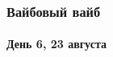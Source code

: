 \begin{frame}
	\frametitle{Вайбовый вайб}
	\framesubtitle{День 6, 23 августа}
    {\tiny
		\begin{minipage}{\fourpicsize}
			\centering
		\end{minipage}
		\hfill
		\begin{minipage}{\fourpicsize}
			\centering

\end{minipage}}
\end{frame}
